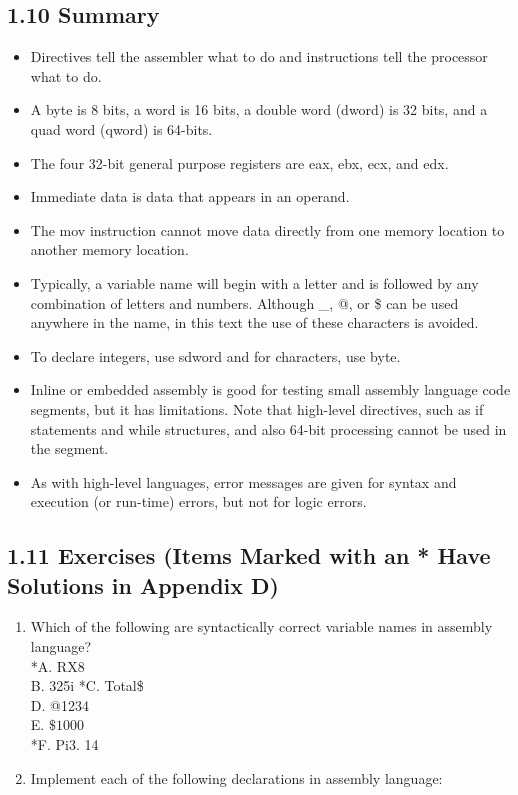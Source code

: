 \documentclass[10pt]{book}
\begin{document}
\subsection*{1.10 Summary}
\begin{itemize}
  \item Directives tell the assembler what to do and instructions tell the processor what to do.
  \item A byte is 8 bits, a word is 16 bits, a double word (dword) is 32 bits, and a quad word (qword) is 64-bits.
  \item The four 32-bit general purpose registers are eax, ebx, ecx, and edx.
  \item Immediate data is data that appears in an operand.
  \item The mov instruction cannot move data directly from one memory location to another memory location.
  \item Typically, a variable name will begin with a letter and is followed by any combination of letters and numbers. Although \_, @, or \$ can be used anywhere in the name, in this text the use of these characters is avoided.
  \item To declare integers, use sdword and for characters, use byte.
  \item Inline or embedded assembly is good for testing small assembly language code segments, but it has limitations. Note that high-level directives, such as if statements and while structures, and also 64-bit processing cannot be used in the segment.
  \item As with high-level languages, error messages are given for syntax and execution (or run-time) errors, but not for logic errors.
\end{itemize}


\subsection*{1.11 Exercises (Items Marked with an * Have Solutions in Appendix D)}
\begin{enumerate}
  \item Which of the following are syntactically correct variable names in assembly language?\\
*A. RX8\\
B. 325i *C. Total\$\\
D. @1234\\
E. $\$ 1000$\\
*F. Pi3. 14
  \item Implement each of the following declarations in assembly language:
\end{enumerate}
\end{document}
